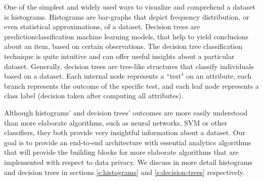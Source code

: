 One of the simplest and widely used ways to visualize and comprehend a dataset is histograms.
Histograms are bar-graphs that depict frequency distribution, or even statistical approximations, of a dataset.
Decision trees are prediction\myslash classification machine learning models, that help to yield conclusions about an item, based on certain observations.
The decision tree classification technique is quite intuitive and can offer useful insights about a particular dataset. 
Generally, decision trees are tree-like structures that classify individuals based on a dataset.
Each internal node represents a ``test" on an attribute, each branch represents the outcome of the specific test, and each leaf node represents a class label (decision taken after computing all attributes).

Although histograms' and decision trees' outcomes are more easily understood than more elaborate algorithms, such as neural networks, SVM or other classifiers, they both provide very insightful information about a dataset.
Our goal is to provide an end-to-end architecture with essential analytics algorithms that will provide the building blocks for more elaborate algorithms that are implemented with respect to data privacy.
We discuss in more detail histograms and decision trees in sections \ref{s:histograms} and \ref{s:decision-trees} respectively.


